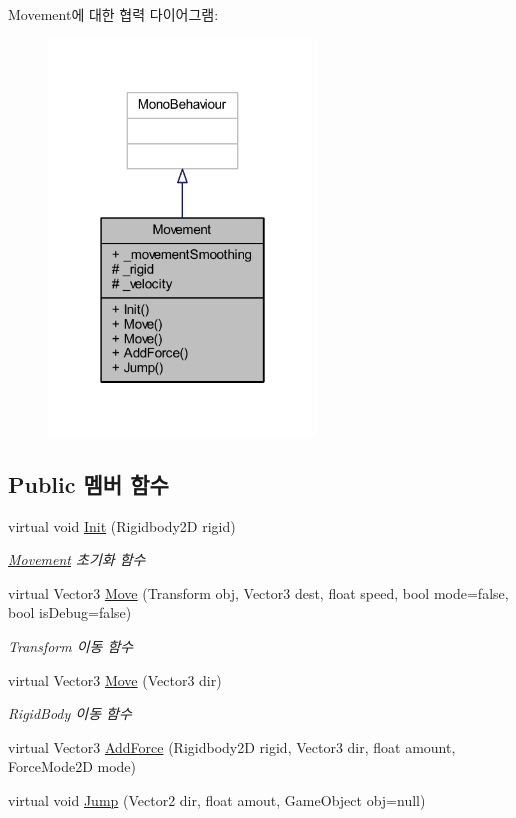 Movement에 대한 협력 다이어그램\+:
\nopagebreak
\begin{figure}[H]
\begin{center}
\leavevmode
\includegraphics[width=202pt]{d6/dad/class_movement__coll__graph}
\end{center}
\end{figure}
\subsection*{Public 멤버 함수}
\begin{DoxyCompactItemize}
\item 
virtual void \mbox{\hyperlink{class_movement_a1c50c07edbe274e1cf55253e87506684}{Init}} (Rigidbody2D rigid)
\begin{DoxyCompactList}\small\item\em \mbox{\hyperlink{class_movement}{Movement}} 초기화 함수 \end{DoxyCompactList}\item 
virtual Vector3 \mbox{\hyperlink{class_movement_ad400f155e0556a5e22a74cb77858460a}{Move}} (Transform obj, Vector3 dest, float speed, bool mode=false, bool is\+Debug=false)
\begin{DoxyCompactList}\small\item\em Transform 이동 함수 \end{DoxyCompactList}\item 
virtual Vector3 \mbox{\hyperlink{class_movement_a0a304da685db92346b7e274c2b0f023e}{Move}} (Vector3 dir)
\begin{DoxyCompactList}\small\item\em Rigid\+Body 이동 함수 \end{DoxyCompactList}\item 
virtual Vector3 \mbox{\hyperlink{class_movement_ab0b20a2f058e2eed15f4bdf0503a2566}{Add\+Force}} (Rigidbody2D rigid, Vector3 dir, float amount, Force\+Mode2D mode)
\item 
virtual void \mbox{\hyperlink{class_movement_a561e8f643a3f3cd6b0b6789c72161e98}{Jump}} (Vector2 dir, float amout, Game\+Object obj=null)
\end{DoxyCompactItemize}
